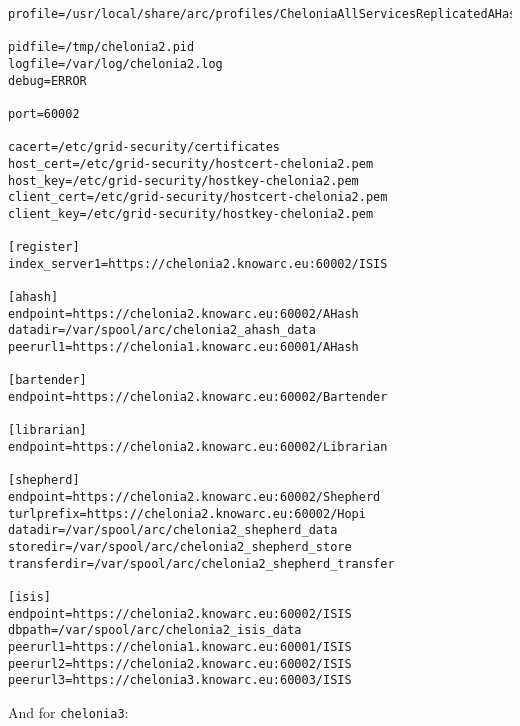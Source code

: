 \documentclass{article}
\begin{document}
\begin{verbatim}
profile=/usr/local/share/arc/profiles/CheloniaAllServicesReplicatedAHashWithISIS.xml

pidfile=/tmp/chelonia2.pid
logfile=/var/log/chelonia2.log
debug=ERROR

port=60002

cacert=/etc/grid-security/certificates
host_cert=/etc/grid-security/hostcert-chelonia2.pem
host_key=/etc/grid-security/hostkey-chelonia2.pem
client_cert=/etc/grid-security/hostcert-chelonia2.pem
client_key=/etc/grid-security/hostkey-chelonia2.pem

[register]
index_server1=https://chelonia2.knowarc.eu:60002/ISIS

[ahash]
endpoint=https://chelonia2.knowarc.eu:60002/AHash
datadir=/var/spool/arc/chelonia2_ahash_data
peerurl1=https://chelonia1.knowarc.eu:60001/AHash

[bartender]
endpoint=https://chelonia2.knowarc.eu:60002/Bartender

[librarian]
endpoint=https://chelonia2.knowarc.eu:60002/Librarian

[shepherd]
endpoint=https://chelonia2.knowarc.eu:60002/Shepherd
turlprefix=https://chelonia2.knowarc.eu:60002/Hopi
datadir=/var/spool/arc/chelonia2_shepherd_data
storedir=/var/spool/arc/chelonia2_shepherd_store
transferdir=/var/spool/arc/chelonia2_shepherd_transfer

[isis]
endpoint=https://chelonia2.knowarc.eu:60002/ISIS
dbpath=/var/spool/arc/chelonia2_isis_data
peerurl1=https://chelonia1.knowarc.eu:60001/ISIS
peerurl2=https://chelonia2.knowarc.eu:60002/ISIS
peerurl3=https://chelonia3.knowarc.eu:60003/ISIS
\end{verbatim}

And for \verb!chelonia3!:
\end{document}
